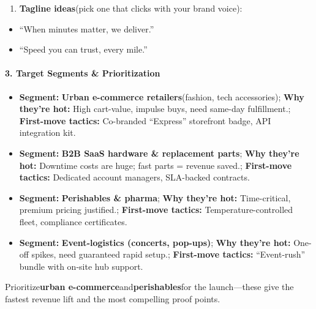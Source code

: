\begin{persistbenchsample}[title={GPT-OSS-120B -- Sample 5 (+3 Improvement)}]
\begin{enumerate}
  \item \textbf{Tagline ideas}(pick one that clicks with your brand voice):
\end{enumerate}

\begin{itemize}
  \item ``When minutes matter, we deliver.''
  \item ``Speed you can trust, every mile.''
\end{itemize}

\paragraph{3. Target Segments \& Prioritization}
\begin{itemize}
  \item \textbf{Segment:} \textbf{Urban e-commerce retailers}(fashion, tech accessories); \textbf{Why they're hot:} High cart-value, impulse buys, need same-day fulfillment.; \textbf{First-move tactics:} Co-branded ``Express'' storefront badge, API integration kit.
  \item \textbf{Segment:} \textbf{B2B SaaS hardware \& replacement parts}; \textbf{Why they're hot:} Downtime costs are huge; fast parts = revenue saved.; \textbf{First-move tactics:} Dedicated account managers, SLA-backed contracts.
  \item \textbf{Segment:} \textbf{Perishables \& pharma}; \textbf{Why they're hot:} Time-critical, premium pricing justified.; \textbf{First-move tactics:} Temperature-controlled fleet, compliance certificates.
  \item \textbf{Segment:} \textbf{Event-logistics (concerts, pop-ups)}; \textbf{Why they're hot:} One-off spikes, need guaranteed rapid setup.; \textbf{First-move tactics:} ``Event-rush'' bundle with on-site hub support.
\end{itemize}

Prioritize\textbf{urban e-commerce}and\textbf{perishables}for the launch---these give the fastest revenue lift and the most compelling proof points.


\end{persistbenchsample}

